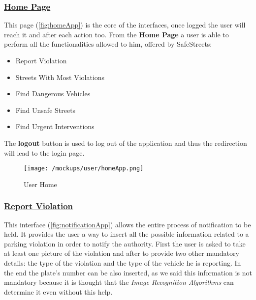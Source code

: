 			\FloatBarrier
		\subsubsection[Home Page]{\hyperlink{toc}{Home Page}}
			\label{sec:userHomePage}
			
			This page (\autoref{fig:homeApp}) is the core of the interfaces, once logged the user will reach it and after each action too. From the \textbf{Home Page} a user is able to perform all the functionalities allowed to him, offered by SafeStreets:
			
			\begin{itemize}
				\item Report Violation
				\item Streets With Most Violations
				\item Find Dangerous Vehicles
				\item Find Unsafe Streets
				\item Find Urgent Interventions
			\end{itemize}
		
			The \textbf{logout} button is used to log out of the application and thus the redirection will lead to the login page.\\
			
			\begin{figure}[ht!]
				\centering
				\texttt{[image: /mockups/user/homeApp.png]}
				\caption{\label{fig:homeApp} User Home}
			\end{figure}
		
			\FloatBarrier

		\subsubsection[Report Violation]{\hyperlink{toc}{Report Violation}}
			\label{sec:userReportViolation}
			
			This interface (\autoref{fig:notificationApp}) allows the entire process of notification to be held. It provides the user a way to insert all the possible information related to a parking violation in order to notify the authority. First the user is asked to take at least one picture of the violation and after to provide two other mandatory details: the type of the violation and the type of the vehicle he is reporting. In the end the plate's number can be also inserted, as we said this information is not mandatory because it is thought that the \emph{Image Recognition Algorithms} can determine it even without this help.\\
			
